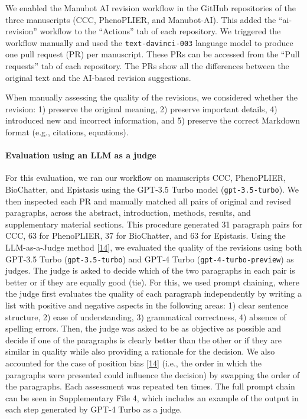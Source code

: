 \documentclass[
]{article}
\begin{document}
We enabled the Manubot AI revision workflow in the GitHub repositories of the three manuscripts (CCC, PhenoPLIER, and Manubot-AI).
This added the ``ai-revision'' workflow to the ``Actions'' tab of each repository.
We triggered the workflow manually and used the \texttt{text-davinci-003} language model to produce one pull request (PR) per manuscript.
These PRs can be accessed from the ``Pull requests'' tab of each repository.
The PRs show all the differences between the original text and the AI-based revision suggestions.

When manually assessing the quality of the revisions, we considered whether the revision:
1) preserve the original meaning,
2) preserve important details,
4) introduced new and incorrect information, and
5) preserve the correct Markdown format (e.g., citations, equations).

\paragraph{Evaluation using an LLM as a judge}

For this evaluation, we ran our workflow on manuscripts CCC, PhenoPLIER, BioChatter, and Epistasis using the GPT-3.5 Turbo model (\texttt{gpt-3.5-turbo}).
We then inspected each PR and manually matched all pairs of original and revised paragraphs, across the abstract, introduction, methods, results, and supplementary material sections.
This procedure generated 31 paragraph pairs for CCC, 63 for PhenoPLIER, 37 for BioChatter, and 63 for Epistasis.
Using the LLM-as-a-Judge method {[}\protect\hyperlink{ref-LhEwBH2w}{14}{]}, we evaluated the quality of the revisions using both GPT-3.5 Turbo (\texttt{gpt-3.5-turbo}) and GPT-4 Turbo (\texttt{gpt-4-turbo-preview}) as judges.
The judge is asked to decide which of the two paragraphs in each pair is better or if they are equally good (tie).
For this, we used prompt chaining, where the judge first evaluates the quality of each paragraph independently by writing a list with positive and negative aspects in the following areas: 1) clear sentence structure, 2) ease of understanding, 3) grammatical correctness, 4) absence of spelling errors.
Then, the judge was asked to be as objective as possible and decide if one of the paragraphs is clearly better than the other or if they are similar in quality while also providing a rationale for the decision.
We also accounted for the case of position bias {[}\protect\hyperlink{ref-LhEwBH2w}{14}{]} (i.e., the order in which the paragraphs were presented could influence the decision) by swapping the order of the paragraphs.
Each assessment was repeated ten times.
The full prompt chain can be seen in Supplementary File 4, which includes an example of the output in each step generated by GPT-4 Turbo as a judge.
\end{document}
